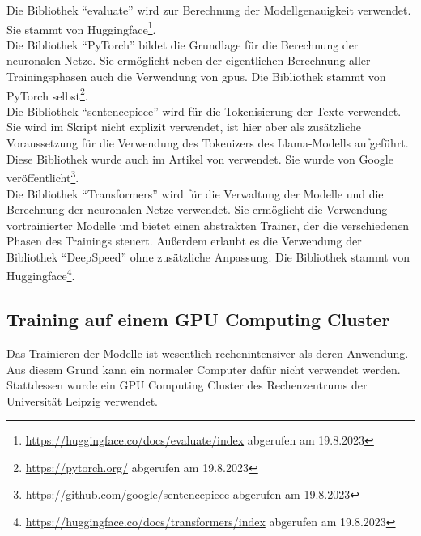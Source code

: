 Die Bibliothek \enquote{evaluate} wird zur Berechnung der Modellgenauigkeit verwendet.
Sie stammt von Huggingface\footnote{\url{https://huggingface.co/docs/evaluate/index} abgerufen am 19.8.2023}.\\

Die Bibliothek \enquote{PyTorch} bildet die Grundlage für die Berechnung der neuronalen Netze.
Sie ermöglicht neben der eigentlichen Berechnung aller Trainingsphasen auch die Verwendung von \ac{gpu}s. Die Bibliothek stammt von PyTorch selbst\footnote{\url{https://pytorch.org/} abgerufen am 19.8.2023}.\\

Die Bibliothek \enquote{sentencepiece} wird für die Tokenisierung der Texte verwendet.
Sie wird im Skript nicht explizit verwendet, ist hier aber als zusätzliche Voraussetzung für die Verwendung des Tokenizers des Llama-Modells aufgeführt.
Diese Bibliothek wurde auch im Artikel von \citet{llama} verwendet.
Sie wurde von Google veröffentlicht\footnote{\url{https://github.com/google/sentencepiece} abgerufen am 19.8.2023}.\\

Die Bibliothek \enquote{Transformers} wird für die Verwaltung der Modelle und die Berechnung der neuronalen Netze verwendet.
Sie ermöglicht die Verwendung vortrainierter Modelle und bietet einen abstrakten Trainer, der die verschiedenen Phasen des Trainings steuert.
Außerdem erlaubt es die Verwendung der Bibliothek \enquote{DeepSpeed} ohne zusätzliche Anpassung.
Die Bibliothek stammt von Huggingface\footnote{\url{https://huggingface.co/docs/transformers/index} abgerufen am 19.8.2023}.\\

\subsection{Training auf einem GPU Computing Cluster}\label{sec:training-cluster}
Das Trainieren der Modelle ist wesentlich rechenintensiver als deren Anwendung.
Aus diesem Grund kann ein normaler Computer dafür nicht verwendet werden.
Stattdessen wurde ein GPU Computing Cluster des Rechenzentrums der Universität Leipzig verwendet.\\


